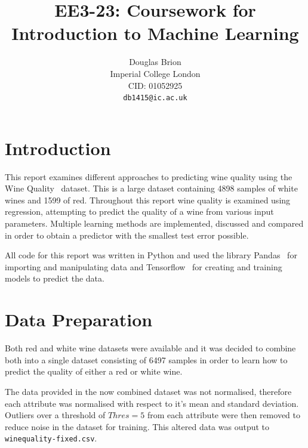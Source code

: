 \documentclass[10pt,twocolumn,letterpaper]{article}
\begin{document}
\title{EE3-23: Coursework for Introduction to Machine Learning}

\author{Douglas Brion\\
Imperial College London\\
CID: 01052925\\
{\tt\small db1415@ic.ac.uk}
}

\maketitle


\section{Introduction}

This report examines different approaches to predicting wine quality using the Wine Quality~\cite{WineQuality} dataset. This is a large dataset containing 4898 samples of white wines and 1599 of red. Throughout this report wine quality is examined using regression, attempting to predict the quality of a wine from various input parameters. Multiple learning methods are implemented, discussed and compared in order to obtain a predictor with the smallest test error possible.

All code for this report was written in Python and used the library Pandas~\cite{mckinneypandas} for importing and manipulating data and Tensorflow~\cite{tensorflow2015-whitepaper} for creating and training models to predict the data.

\section{Data Preparation}
Both red and white wine datasets were available and it was decided to combine both into a single dataset consisting of 6497 samples in order to learn how to predict the quality of either a red or white wine. 

The data provided in the now combined dataset was not normalised, therefore each attribute was normalised with respect to it's mean and standard deviation. Outliers over a threshold of $Thres = 5$ from each attribute were then removed to reduce noise in the dataset for training. This altered data was output to 
\verb|winequality-fixed.csv|.
\end{document}
